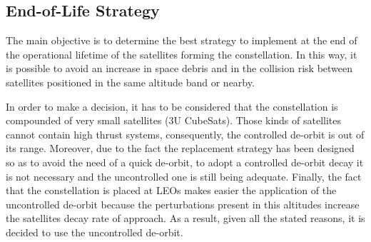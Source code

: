 \subsection{End-of-Life Strategy}
The main objective is to determine the best strategy to implement at the end of the operational lifetime of the satellites forming the constellation. In this way, it is possible to avoid an increase in space debris and in the collision risk between satellites positioned in the same altitude band or nearby.

In order to make a decision, it has to be considered that the constellation is compounded of very small satellites (3U CubeSats). Those kinds of satellites cannot contain high thrust systems, consequently, the controlled de-orbit is out of its range. Moreover, due to the fact the replacement strategy has been designed so as to avoid the need of a quick de-orbit, to adopt a controlled de-orbit decay it is not necessary and the uncontrolled one is still being adequate. Finally, the fact that the constellation is placed at LEOs makes easier the application of the uncontrolled de-orbit because the perturbations present in this altitudes increase the satellites decay rate of approach. As a result, given all the stated reasons, it is decided to use the uncontrolled de-orbit. 